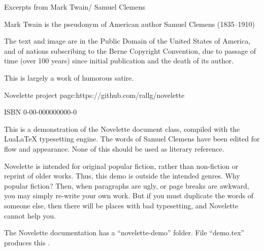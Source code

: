 \documentclass[../demo.tex]{novelettesubdoc}
\begin{document}
\begin{fullpage} %
\null\null\null\null\null %
\null\null\null %
\vfill %
\end{fullpage}

\begin{legal} %
Excerpts from Mark Twain\br/ Samuel Clemens\par
Mark Twain is the pseudonym of American\br
author Samuel Clemens (1835--1910)\par
The text and image are in the Public Domain\br
of the United States of America, and of nations\br
subscribing to the Berne Copyright Convention,\br
due to passage of time (over 100 years) since\br
initial publication and the death of its author.\par
This is largely a work of humorous satire.\par
Novelette project page:\br https://github.com/rallg/novelette\par
ISBN 0-00-000000000-0\par
\end{legal}


\begin{fullpage} %
\begin{upperpage}
\null\null\null\null %
\null\null %
\end{upperpage}
\begin{blockindent}[2,2]
This is a demonstration of the Novelette document
class, compiled with the LuaLaTeX typesetting engine.
The words of Samuel Clemens have been edited for flow and appearance.
None of this should be used as literary reference.\par
\forceindent Novelette is intended for original popular fiction, rather than
non-fiction or reprint of older works. Thus, this demo is outside the intended
genres. Why  popular fiction? Then, when paragraphs are ugly,
or page breaks are awkward, you may simply re-write your own work.
But if you must duplicate the words of someone else, then there will be places
with bad typesetting, and Novelette cannot help you.\par 
\forceindent The Novelette documentation has a ``novelette-demo'' folder.
File ``demo.tex'' produces this .\par
\end{blockindent}
\end{fullpage}


\blankpage %
\end{document}
